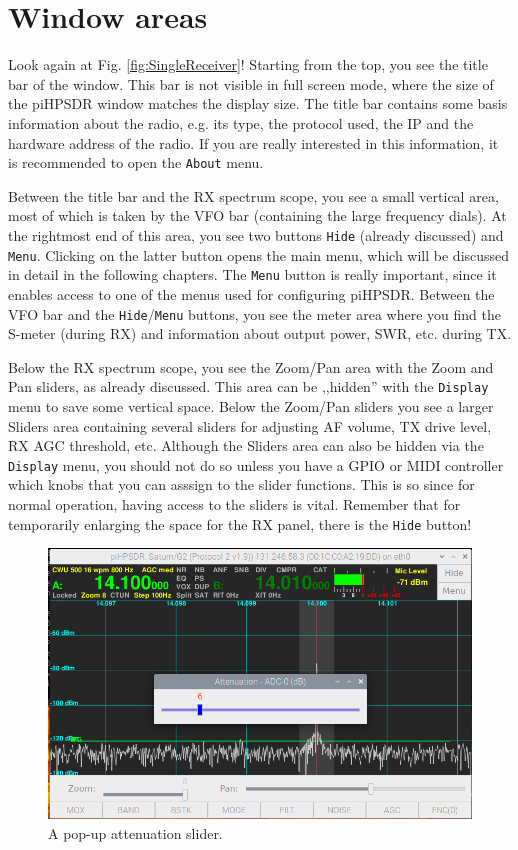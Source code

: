 \documentclass[12pt]{book}
\def\rett#1{\texttt{\color{red}#1}}
\def\bltt#1{\texttt{\color{blue}#1}}
\begin{document}
\section{Window areas}

Look again at Fig. \ref{fig:SingleReceiver}! Starting from the
top, you see the title bar of the window. This bar is not visible
in full screen mode, where the size of the piHPSDR window matches
the display size. The title bar contains some basis information
about the radio, e.g.  its type, the protocol used, the  IP
and the hardware address of the radio. If you are really interested
in this information, it is recommended to open the
\bltt{About} menu.

Between the title bar and the RX spectrum scope, you see
a small vertical area, most of  which is taken by the VFO bar
(containing the large frequency dials). At the rightmost
end of this area, you see two buttons \rett{Hide} (already
discussed) and \rett{Menu}. Clicking on the latter button opens
the main menu, which will be discussed in detail in the following
chapters. The \rett{Menu} button is really important, since it
enables access to one of the menus used for configuring piHPSDR.
Between the VFO bar and the \rett{Hide}/\rett{Menu} buttons,
you see the meter area where you find the S-meter (during RX)
and information about output power, SWR, etc. during TX.

Below the RX  spectrum scope, you see the Zoom/Pan area with
the  Zoom and Pan sliders, as already discussed. This area
can be ,,hidden'' with the \bltt{Display} menu to save some
vertical space. Below the
Zoom/Pan sliders you see a larger  Sliders area containing
several sliders for adjusting AF volume, TX  drive level,
RX  AGC threshold, etc. Although the Sliders area can also
be hidden via the \bltt{Display} menu, you should not do so
unless you have a GPIO or MIDI controller which knobs that
you can asssign to the slider functions. This is so since
for  normal operation, having access to the sliders is vital.
Remember that for temporarily enlarging the space for
the RX  panel, there is the \rett{Hide} button!

\begin{figure}
\center
\includegraphics[width=12cm]{SliderOnScreen.png}
\caption{A pop-up attenuation slider.}
\label{fig:SliderOnScreen}
\end{figure}
\end{document}
